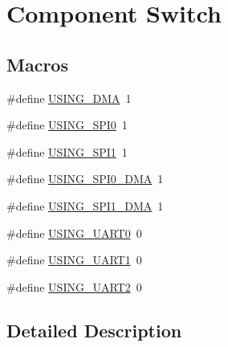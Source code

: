 \hypertarget{group___cmp_sw}{\section{Component Switch}
\label{group___cmp_sw}
}
\subsection*{Macros}
\begin{DoxyCompactItemize}
\item 
\#define \hyperlink{group___cmp_sw_gae5d3a4c6dbdfd25ac934e2ac5ed2f197}{U\-S\-I\-N\-G\-\_\-\-D\-M\-A}~1
\item 
\#define \hyperlink{group___cmp_sw_ga58f2fb6c12e31031d99a9a16087a521b}{U\-S\-I\-N\-G\-\_\-\-S\-P\-I0}~1
\item 
\#define \hyperlink{group___cmp_sw_ga23b2d5849170b623e0ffb6abe3a293c3}{U\-S\-I\-N\-G\-\_\-\-S\-P\-I1}~1
\item 
\#define \hyperlink{group___cmp_sw_ga695beb9f0cf09fdb6ea606a8010c5660}{U\-S\-I\-N\-G\-\_\-\-S\-P\-I0\-\_\-\-D\-M\-A}~1
\item 
\#define \hyperlink{group___cmp_sw_ga8c39d32b3fccc552b52841e1a1735e20}{U\-S\-I\-N\-G\-\_\-\-S\-P\-I1\-\_\-\-D\-M\-A}~1
\item 
\#define \hyperlink{group___cmp_sw_ga6d183a02d3b71ad7b3d743bdc3b00c76}{U\-S\-I\-N\-G\-\_\-\-U\-A\-R\-T0}~0
\item 
\#define \hyperlink{group___cmp_sw_ga4f8569b3e7ace3d2309f2d3c13b58436}{U\-S\-I\-N\-G\-\_\-\-U\-A\-R\-T1}~0
\item 
\#define \hyperlink{group___cmp_sw_ga64bdcbc52daedc5e6a149b8fde2867ae}{U\-S\-I\-N\-G\-\_\-\-U\-A\-R\-T2}~0
\end{DoxyCompactItemize}


\subsection{Detailed Description}



